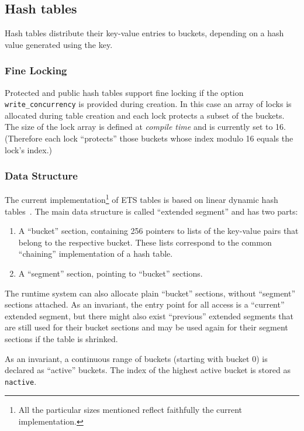\documentclass[aps,pre,preprint,nofootinbib]{revtex4}
\begin{document}
\subsection{Hash tables}

Hash tables distribute their key-value entries to buckets, depending on a hash value generated using the key.

\subsubsection{Fine Locking}

Protected and public hash tables support fine locking if the option \verb|write_concurrency| is provided during creation.
In this case an array of locks is allocated during table creation and each lock protects a subset of the buckets.
The size of the lock array is defined at \emph{compile time} and is currently set to 16.
(Therefore each lock ``protects'' those buckets whose index modulo 16 equals the lock's index.)

\subsubsection{Data Structure}

The current implementation\footnote{All the particular sizes mentioned reflect faithfully the current implementation.} of ETS tables is based on linear dynamic hash tables~\cite{Larson}.
The main data structure is called ``extended segment'' and has two parts:
\begin{enumerate}
  \item A ``bucket'' section, containing 256 pointers to lists of the key-value pairs that belong to the respective bucket.
    These lists correspond to the common ``chaining'' implementation of a hash table.
  \item A ``segment'' section, pointing to ``bucket'' sections.
\end{enumerate}
The runtime system can also allocate plain ``bucket'' sections, without ``segment'' sections attached.
As an invariant, the entry point for all access is a ``current'' extended segment, but there might also exist ``previous'' extended segments that are still used for their bucket sections and may be used again for their segment sections if the table is shrinked.

As an invariant, a continuous range of buckets (starting with bucket 0) is declared as ``active'' buckets.
The index of the highest active bucket is stored as \verb|nactive|.
\end{document}
